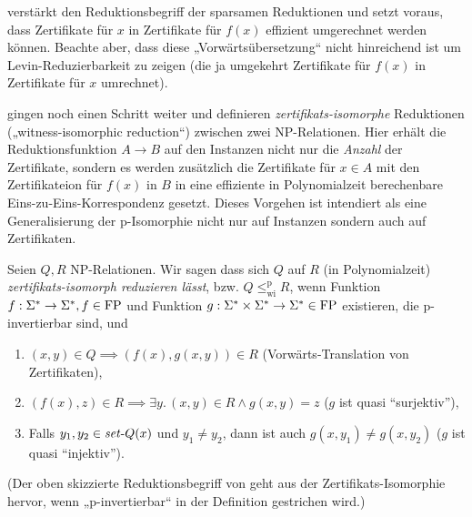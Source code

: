 \textcite{lynch_structure_1978} verstärkt den Reduktionsbegriff der sparsamen Reduktionen und setzt voraus, dass Zertifikate für $x$ in Zertifikate für $f(x)$ effizient umgerechnet werden können. Beachte aber, dass diese „Vorwärtsübersetzung“ nicht hinreichend ist um Levin-Reduzierbarkeit zu zeigen (die ja umgekehrt Zertifikate für $f(x)$ in Zertifikate für $x$ umrechnet).

\cite{wiedermann_witness-isomorphic_1995} gingen noch einen Schritt weiter und definieren \emph{zertifikats-isomorphe} Reduktionen („witness-isomorphic reduction“) zwischen zwei NP-Relationen. Hier erhält die Reduktionsfunktion $A\to B$ auf den Instanzen nicht nur die \emph{Anzahl} der Zertifikate, sondern es werden zusätzlich die Zertifikate für $x\in A$ mit den Zertifikateion für $f(x)$ in $B$ in eine effiziente in Polynomialzeit berechenbare Eins-zu-Eins-Korrespondenz gesetzt. Dieses Vorgehen ist intendiert als eine Generalisierung der p-Isomorphie \parencite{hartmanis_isomorphisms_1976} nicht nur auf Instanzen sondern auch auf Zertifikaten.

\begin{definition}\label{def:wi-reduction}
    Seien $Q, R$ NP-Relationen. Wir sagen dass sich $Q$ auf $R$ (in Polynomialzeit) \emph{zertifikats-isomorph reduzieren lässt}, bzw. $Q\leq_\mathrm{wi}^\mathrm p R$, wenn Funktion $f:\Sigma^*\to\Sigma^*, f\in \mathrm{FP}$ und Funktion $g:\Sigma^*\times\Sigma^*\to\Sigma^*\in\mathrm{FP}$ existieren, die p-invertierbar sind, und 
    \begin{enumerate}
        \item $(x,y)\in Q \implies (f(x), g(x,y))\in R$ (Vorwärts-Translation von Zertifikaten),
        \item $(f(x),z)\in R \implies \exists y.\, (x,y)\in R\land g(x,y)=z$ ($g$ ist quasi “surjektiv”),
        \item Falls $y_1,y_2\in \mathit{set}\text{-}{}Q(x)$ und $y_1\neq y_2$, dann ist auch $g(x,y_1)\neq g(x,y_2)$ ($g$ ist quasi “injektiv”). \qedhere
    \end{enumerate}
\end{definition}
(Der oben skizzierte Reduktionsbegriff von \textcite{lynch_structure_1978} geht aus der Zertifikats-Isomorphie hervor, wenn „p-invertierbar“ in der Definition gestrichen wird.)

